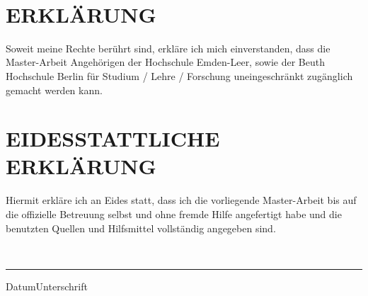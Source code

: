 
\maketitle
\clearpage
\thispagestyle{empty}
~
\newpage



\clearpage
\newpage


\vspace{10ex}
\section*{ERKLÄRUNG}

Soweit meine Rechte berührt sind, erkläre ich mich einverstanden, dass die Master-Arbeit Angehörigen der Hochschule Emden-Leer, sowie der Beuth Hochschule Berlin für Studium / Lehre / Forschung uneingeschränkt zugänglich gemacht werden kann.

\section*{EIDESSTATTLICHE ERKLÄRUNG}

Hiermit erkläre ich an Eides statt, dass ich die vorliegende Master-Arbeit bis auf die offizielle Betreuung selbst und ohne fremde Hilfe angefertigt habe und die benutzten Quellen und Hilfsmittel vollständig angegeben sind.

\vspace{10ex}\\

\hrule
{\small{Datum}}\hfill{\small{Unterschrift}}


\setcounter{tocdepth}{1}
\tableofcontents
